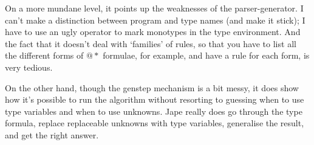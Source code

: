 On a more mundane level, it points up the weaknesses of the parser-generator. I can't make a distinction between program and type names (and make it stick); I have to use an ugly operator to mark monotypes in the type environment. And the fact that it doesn't deal with `families' of rules, so that you have to list all the different forms of $@*$ formulae, for example, and have a rule for each form, is very tedious.

On the other hand, though the genstep mechanism is a bit messy, it does show how it's possible to run the algorithm without resorting to guessing when to use type variables and when to use unknowns. Jape really does go through the type formula, replace replaceable unknowns with type variables, generalise the result, and get the right answer.



%

%
 